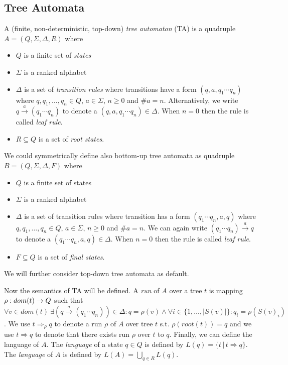 \subsection{Tree Automata}
\label{subsec:ta}

A (finite, non-deterministic, top-down) \emph{tree automaton} (TA) is a
quadruple $A = (Q, \Sigma, \Delta, R)$ where
\begin{itemize}
	\item $Q$ is a finite set of \emph{states}
	\item $\Sigma$ is a ranked alphabet
	\item $\Delta$ is a set of \emph{transition rules} where transitions have a form $(q,a,q_1 \cdots q_n)$ where $q,q_1,\ldots,q_n \in Q$, $a \in \Sigma$, $n \geq 0$ and $\#a = n$.
		Alternatively, we write $q \xrightarrow{a} (q_1 \cdots q_n)$ to denote a $(q,a,q_1 \cdots q_n) \in \Delta$.
		When $n=0$ then the rule is called \emph{leaf rule}.
	\item $R \subseteq Q$ is a set of \emph{root states}.
\end{itemize}

We could symmetrically define also bottom-up tree automata as quadruple $B = (Q, \Sigma, \Delta, F)$ where
\begin{itemize}
	\item $Q$ is a finite set of states
	\item $\Sigma$ is a ranked alphabet
	\item $\Delta$ is a set of transition rules where transition has a form $(q_1 \cdots q_n,a,q)$ where $q,q_1,\ldots,q_n \in Q$, $a \in \Sigma$, $n \geq 0$ and $\#a = n$.
		We can again write $(q_1 \cdots q_n) \xrightarrow{a} q$ to denote a $(q_1 \cdots q_n,a,q) \in \Delta$.
		When $n=0$ then the rule is called \emph{leaf rule}.
	\item $F \subseteq Q$ is a set of \emph{final states}.
\end{itemize}

We will further consider top-down tree automata as default.

Now the semantics of TA will be defined.
A \emph{run} of $A$ over a tree $t$ is mapping $\rho: dom(t) \rightarrow Q$ such that
$\forall v \in dom(t)\ \exists (q \xrightarrow{a} (q_1 \cdots q_n)) \in \Delta:  q=\rho(v) \wedge  \forall i \in \{1, \ldots, |S(v)|\}: q_i=\rho(S(v)_i)$.
We use $t \Rightarrow_{\rho} q$ to denote a run $\rho$ of $A$ over tree $t$ s.t. $\rho(root(t)) = q$ and we use $t \Rightarrow q$ to denote that there exists
run $\rho$ over $t$ to $q$.
Finally, we can define the language of $A$.
The \emph{language} of a state $q\in Q$ is defined by $L(q) = \{t\,|\, t \Rightarrow q\}$.
The \emph{language} of $A$ is defined by $L(A) = \bigcup_{q\in R} L(q)$.

